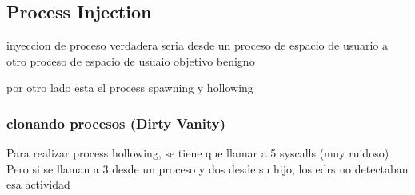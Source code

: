 \subsection{Process Injection}

inyeccion de proceso verdadera seria desde un proceso de espacio de usuario
a otro proceso de espacio de usuaio objetivo benigno

por otro lado esta el process spawning y hollowing

\subsubsection{clonando procesos (Dirty Vanity)}

Para realizar process hollowing, se tiene que llamar a 5 syscalls (muy ruidoso)
Pero si se llaman a 3 desde un proceso y dos desde su hijo, los edrs no
detectaban esa actividad